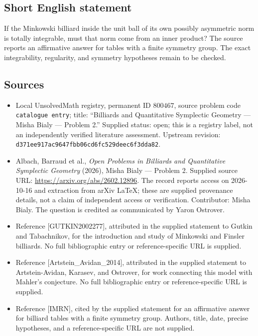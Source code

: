 \documentclass[11pt]{article}
\begin{document}
\subsection{Short English statement}
If the Minkowski billiard inside the unit ball of its own possibly asymmetric norm is totally integrable, must that norm come from an inner product? The source reports an affirmative answer for tables with a finite symmetry group. The exact integrability, regularity, and symmetry hypotheses remain to be checked.
\subsection{Sources}
\begin{itemize}
\item Local UnsolvedMath registry, permanent ID \(800467\), source problem code \texttt{catalogue entry}; title: ``Billiards and Quantitative Symplectic Geometry --- Misha Bialy --- Problem 2.'' Supplied status: open; this is a registry label, not an independently verified literature assessment. Upstream revision: \texttt{d371ee917ac9647fbb06cd6fc529deec6f3dda82}.
\item Albach, Barraud et al., \emph{Open Problems in Billiards and Quantitative Symplectic Geometry} (2026), Misha Bialy --- Problem 2. Supplied source URL: \url{https://arxiv.org/abs/2602.12896}. The record reports access on 2026-10-16 and extraction from arXiv LaTeX; these are supplied provenance details, not a claim of independent access or verification. Contributor: Misha Bialy. The question is credited as communicated by Yaron Ostrover.
\item Reference [GUTKIN2002277], attributed in the supplied statement to Gutkin and Tabachnikov, for the introduction and study of Minkowski and Finsler billiards. No full bibliographic entry or reference-specific URL is supplied.
\item Reference [Artstein\_Avidan\_2014], attributed in the supplied statement to Artstein-Avidan, Karasev, and Ostrover, for work connecting this model with Mahler's conjecture. No full bibliographic entry or reference-specific URL is supplied.
\item Reference [IMRN], cited by the supplied statement for an affirmative answer for billiard tables with a finite symmetry group. Authors, title, date, precise hypotheses, and a reference-specific URL are not supplied.
\end{itemize}
\end{document}
